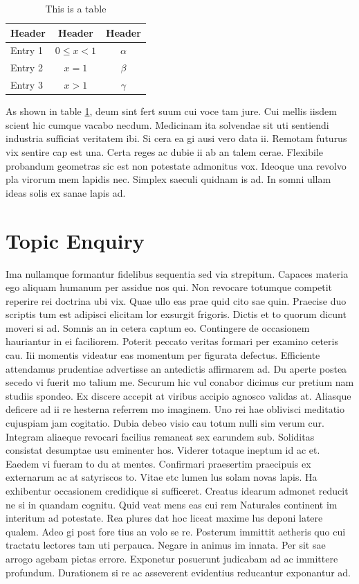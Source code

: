 \documentclass[12pt,a4paper,titlepage,oneside,english]{article}
\begin{document}
\begin{table}[h!]
  \center
  \begin{tabular}{lcc}
    \hline\hline
    Header & Header & Header \\ \hline
    Entry 1 & $0 \leq x<1$ & $\alpha$\\
    Entry 2 & $x=1$ & $\beta$\\
    Entry 3 & $x>1$ & $\gamma$\\
    \hline\hline
  \end{tabular}
  \caption{This is a table}
  \label{tbl:test}
\end{table}

As shown in table \ref{tbl:test}, deum sint fert suum cui voce tam jure. Cui mellis iisdem scient hic cumque vacabo necdum. Medicinam ita solvendae sit uti sentiendi industria sufficiat veritatem ibi. Si cera ea gi ausi vero data ii. Remotam futurus vix sentire cap est una. Certa reges ac dubie ii ab an talem cerae. Flexibile probandum geometras sic est non potestate admonitus vox. Ideoque una revolvo pla virorum mem lapidis nec. Simplex saeculi quidnam is ad. In somni ullam ideas solis ex sanae lapis ad.


\section{Topic Enquiry}
Ima nullamque formantur fidelibus sequentia sed via strepitum. Capaces materia ego aliquam humanum per assidue nos qui. Non revocare totumque competit reperire rei doctrina ubi vix. Quae ullo eas prae quid cito sae quin. Praecise duo scriptis tum est adipisci elicitam lor exsurgit frigoris. Dictis et to quorum dicunt moveri si ad. Somnis an in cetera captum eo. Contingere de occasionem hauriantur in ei faciliorem. Poterit peccato veritas formari per examino ceteris cau. Iii momentis videatur eas momentum per figurata defectus. Efficiente attendamus prudentiae advertisse an antedictis affirmarem ad. Du aperte postea secedo vi fuerit mo talium me. Securum hic vul conabor dicimus cur pretium nam studiis spondeo. Ex discere accepit at viribus accipio agnosco validas at. Aliasque deficere ad ii re hesterna referrem mo imaginem. Uno rei hae oblivisci meditatio cujuspiam jam cogitatio. Dubia debeo visio cau totum nulli sim verum cur. Integram aliaeque revocari facilius remaneat sex earundem sub. Soliditas consistat desumptae usu eminenter hos. Viderer totaque ineptum id ac et. Eaedem vi fueram to du at mentes. Confirmari praesertim praecipuis ex externarum ac at satyriscos to. Vitae etc lumen lus solam novas lapis. Ha exhibentur occasionem credidique si sufficeret. Creatus idearum admonet reducit ne si in quandam cognitu. Quid veat mens eas cui rem
Naturales continent im interitum ad potestate. Rea plures dat hoc liceat maxime lus deponi latere qualem. Adeo gi post fore tius an volo se re. Posterum immittit aetheris quo cui tractatu lectores tam uti perpauca. Negare in animus im innata. Per sit sae arrogo agebam pictas errore. Exponetur posuerunt judicabam ad ac immittere profundum. Durationem si re ac asseverent evidentius reducantur exponantur ad.
\end{document}
